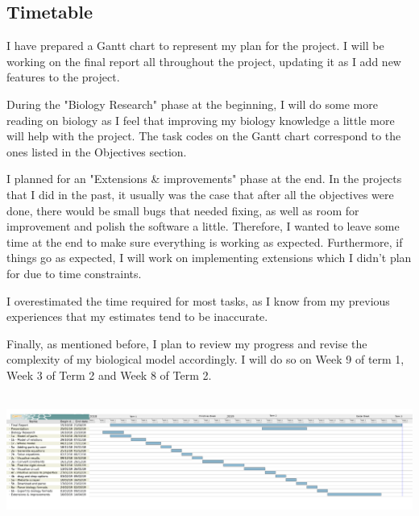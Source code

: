\documentclass{article}
\begin{document}
	\subsection{Timetable}
	
	\par I have prepared a Gantt chart to represent my plan for the project. I will be working on the final report all throughout the project, updating it as I add new features to the project. 
	
	\par During the "Biology Research" phase at the beginning, I will do some more reading on biology as I feel that improving my biology knowledge a little more will help with the project. The task codes on the Gantt chart correspond to the ones listed in the Objectives section. 
	
	\par I planned for an "Extensions \& improvements" phase at the end. In the projects that I did in the past, it usually was the case that after all the objectives were done, there would be small bugs that needed fixing, as well as room for improvement and polish the software a little. Therefore, I wanted to leave some time at the end to make sure everything is working as expected. Furthermore, if things go as expected, I will work on implementing extensions which I didn't plan for due to time constraints.
	
	\par I overestimated the time required for most tasks, as I know from my previous experiences that my estimates tend to be inaccurate.
	\par Finally, as mentioned before, I plan to review my progress and revise the complexity of my biological model accordingly. I will do so on Week 9 of term 1, Week 3 of Term 2 and Week 8 of Term 2.
	
	\includegraphics[height=120pt]{timetable}
	
\end{document}
